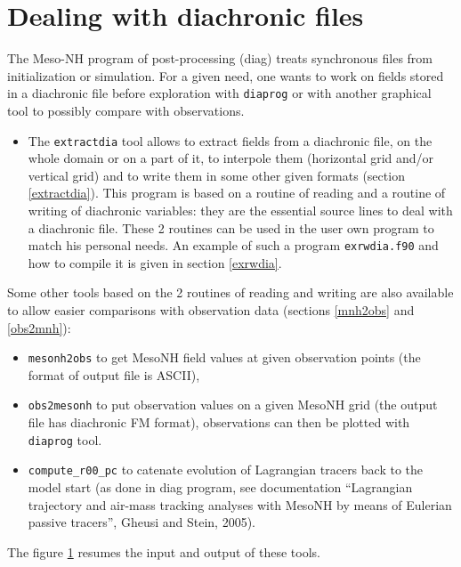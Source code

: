 \section{Dealing with diachronic files}
The Meso-NH program of post-processing ({\sc diag}) treats synchronous 
files from initialization or simulation. 
For a given need, one wants to work on fields stored in
a diachronic file before exploration with {\tt diaprog} or with another
graphical tool to possibly compare with observations.

\begin{itemize}
\item The \texttt{extractdia} tool allows to extract fields from a diachronic 
file, on the whole domain or on a part of it, to interpole them (horizontal
grid and/or vertical grid) and to write 
them in some other given formats (section \ref{extractdia}). 
This program is based on a routine of reading and a routine of writing of 
diachronic variables: 
they are the essential source lines to deal with a diachronic file.
These 2 routines can be used in the user own program to match his personal
needs. An example of such a program \texttt{exrwdia.f90} and how to compile it
is given in section \ref{exrwdia}.
\end{itemize}

Some other tools based on the 2 routines of reading and writing
are also available to allow easier comparisons with observation 
data (sections \ref{mnh2obs} and \ref{obs2mnh}):
\begin{itemize}
\item \texttt{mesonh2obs} to get MesoNH field values at given 
observation points (the format of output file is ASCII),
\item \texttt{obs2mesonh} to put observation values on a
given MesoNH grid (the output file has diachronic FM format),
observations can then be plotted with \texttt{diaprog} tool.
\item \texttt{compute\_r00\_pc} to catenate evolution of Lagrangian tracers 
back to the model start (as done in {\sc diag} program, see documentation 
``Lagrangian trajectory and air-mass tracking analyses with
MesoNH by means of Eulerian passive tracers'', Gheusi and Stein, 2005).
\end{itemize}

The figure \ref{outils_dia} resumes the input and output of these tools.
\begin{figure}[htb] 
\centerline{ } 
\caption{\label{outils_dia}}
\end{figure}
\\

